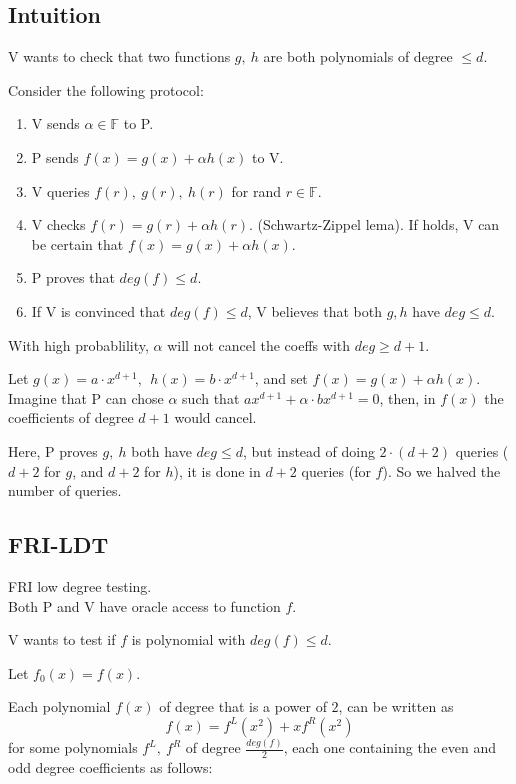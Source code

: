 \documentclass{article}
\theoremstyle{definition}
\begin{document}
\subsection{Intuition}
V wants to check that two functions $g,~h$ are both polynomials of degree $\leq d$.

Consider the following protocol:

\begin{enumerate}
	\item V sends $\alpha \in \mathbb{F}$ to P.
	\item P sends $f(x)=g(x) + \alpha h(x)$ to V.
	\item V queries $f(r), ~g(r), ~h(r)$ for rand $r \in \mathbb{F}$.
	\item V checks $f(r)=g(r) + \alpha h(r)$. (Schwartz-Zippel lema).
		If holds, V can be certain that $f(x)=g(x)+ \alpha h(x)$.
	\item P proves that $deg(f) \leq d$. 
	\item If V is convinced that $deg(f) \leq d$, V believes that both $g, h$ have $deg \leq d$.
\end{enumerate}

With high probablility, $\alpha$ will not cancel the coeffs with $deg \geq d+1$. %

Let $g(x)=a \cdot x^{d+1}, ~~ h(x)=b \cdot x^{d+1}$, and set $f(x) = g(x) + \alpha h(x)$.
Imagine that P can chose $\alpha$ such that $a x^{d+1} + \alpha \cdot b x^{d+1} = 0$, then, in $f(x)$ the coefficients of degree $d+1$ would cancel.

\quad

Here, P proves $g,~h$ both have $deg \leq d$, but instead of doing $2 \cdot (d+2)$ queries ($d+2$ for $g$, and $d+2$ for $h$), it is done in $d+2$ queries (for $f$).
So we halved the number of queries.


\subsection{FRI-LDT}\label{sec:fri-ldt}
FRI low degree testing.\\
Both P and V have oracle access to function $f$.

V wants to test if $f$ is polynomial with $deg(f) \leq d$.

Let $f_0(x)=f(x)$.

Each polynomial $f(x)$ of degree that is a power of $2$, can be written as
$$f(x) = f^L(x^2) + x f^R(x^2)$$
for some polynomials $f^L,~f^R$ of degree $\frac{deg(f)}{2}$, each one containing the even and odd degree coefficients as follows:
\end{document}
